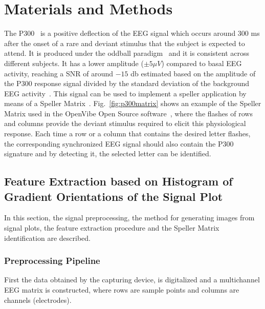 \documentclass[utf8]{frontiersSCNS} %
\begin{document}
\section{Materials and Methods}

The P300~\citep{Farwell1988,Knuth2006} is a positive deflection of the EEG signal which occurs around $300$ ms after the onset of a rare and deviant stimulus that the subject is expected to attend.  It is produced under the oddball paradigm~\citep{WolpawJonathanR2012} and it is consistent across different subjects. It has a lower amplitude  ($\pm 5 \mu V $) compared to basal EEG activity, reaching a SNR of around $-15$ db estimated based on the amplitude of the P300 response signal divided by the standard deviation of the background EEG activity~\citep{Hu2010}.  This signal can be used to implement a speller application by means of a Speller Matrix~\citep{Farwell1988}. Fig.~\ref{fig:p300matrix} shows an example of the Speller Matrix used in the OpenVibe Open Source software~\citep{Renard2010}, where the flashes of rows and columns provide the deviant stimulus required to elicit this physiological response.   Each time a row or a column that contains the desired letter flashes, the corresponding synchronized EEG signal should also contain the P300 signature and by detecting it, the selected letter can be identified.

\subsection{Feature Extraction based on Histogram of Gradient Orientations of the Signal Plot} \label{Feature}

In this section, the signal preprocessing, the method for generating images from signal plots, the feature extraction procedure and the Speller Matrix identification are described. 

\subsubsection{Preprocessing Pipeline} \label{Pipeline}

First the data obtained by the capturing device, is digitalized and a multichannel EEG matrix is constructed, where rows are sample points and columns are channels (electrodes).
\end{document}
